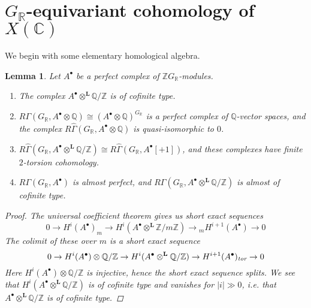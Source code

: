 \documentclass[leqno,12pt]{article}
\theoremstyle{plain}
\newtheorem{lemma}[theorem]{\indent\sc Lemma}
\theoremstyle{definition}
\newcommand{\CC}{\mathbb{C}}
\newcommand{\QQ}{\mathbb{Q}}
\newcommand{\RR}{\mathbb{R}}
\newcommand{\ZZ}{\mathbb{Z}}
\newcommand{\tor}{\text{\it tor}}
\begin{document}
\section{$G_\RR$-equivariant cohomology of $X (\CC)$}
\label{sec:GR-equivariant-cohomology}

We begin with some elementary homological algebra.

\begin{lemma}
  Let $A^\bullet$ be a perfect complex of $\ZZ G_\RR$-modules.

  \begin{enumerate}
  \item[1)] The complex $A^\bullet \otimes^\mathbf{L} \QQ/\ZZ$ is of cofinite
    type.

  \item[2)]
    $R\Gamma (G_\RR, A^\bullet \otimes \QQ) \cong (A^\bullet \otimes
    \QQ)^{G_\RR}$ is a perfect complex of $\QQ$-vector spaces, and the complex
    $R\widehat{\Gamma} (G_\RR, A^\bullet \otimes \QQ)$ is quasi-isomorphic to
    $0$.

  \item[3)]
    $R\widehat{\Gamma} (G_\RR, A^\bullet \otimes^\mathbf{L} \QQ/\ZZ) \cong
    R\widehat{\Gamma} (G_\RR, A^\bullet [+1])$, and these complexes have finite
    $2$-torsion cohomology.

  \item[4)] $R\Gamma (G_\RR, A^\bullet)$ is almost perfect, and
    $R\Gamma (G_\RR, A^\bullet \otimes^\mathbf{L} \QQ/\ZZ)$ is almost of
    cofinite type.
  \end{enumerate}

  \begin{proof}
    The universal coefficient theorem gives us short exact sequences
    $$0 \to H^i (A^\bullet)_m \to H^i (A^\bullet \otimes^\mathbf{L} \ZZ/m\ZZ) \to {}_m H^{i+1} (A^\bullet) \to 0$$
    The colimit of these over $m$ is a short exact sequence
    $$0 \to H^i (A^\bullet) \otimes \QQ/\ZZ \to H^i (A^\bullet \otimes^\mathbf{L} \QQ/\ZZ) \to H^{i+1} (A^\bullet)_\tor \to 0$$
    Here $H^i (A^\bullet) \otimes \QQ/\ZZ$ is injective, hence the short exact
    sequence splits. We see that $H^i (A^\bullet \otimes^\mathbf{L} \QQ/\ZZ)$ is
    of cofinite type and vanishes for $|i| \gg 0$, i.e. that
    $A^\bullet \otimes^\mathbf{L} \QQ/\ZZ$ is of cofinite type.


\end{proof}
\end{lemma}
\end{document}
